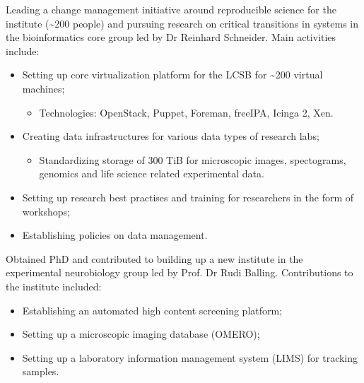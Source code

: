\documentclass[11pt,a4paper,nolmodern, sans]{moderncv}        %
\begin{document}

{Leading a change management initiative around reproducible science for the institute (\textasciitilde 200 people) and pursuing research on critical transitions in systems in the bioinformatics core group led by Dr Reinhard Schneider. \newline{} Main activities include:
\begin{itemize}
	\item Setting up core virtualization platform for the LCSB for \textasciitilde 200 virtual machines;
	\begin{itemize}
		\item Technologies: OpenStack, Puppet, Foreman, freeIPA, Icinga 2, Xen.
	\end{itemize}
	\item Creating data infrastructures for various data types of research labs;
  \begin{itemize}
		\item Standardizing storage of 300 TiB for microscopic images, spectograms, genomics and life science related experimental data.
	\end{itemize}
	\item Setting up research best practises and training for researchers in the form of workshops;
	\item Establishing policies on data management.
\end{itemize}}


{Obtained PhD and contributed to building up a new institute in the experimental neurobiology group led by Prof. Dr Rudi Balling. \newline{} Contributions to the institute included:
\begin{itemize}%
	\item Establishing an automated high content screening platform;
	\item Setting up a microscopic imaging database (OMERO);
	\item Setting up a laboratory information management system (LIMS) for tracking samples.
\end{itemize}}

\end{document}
